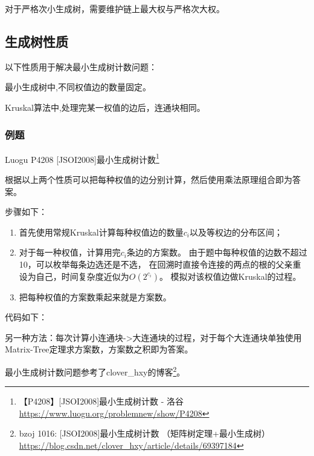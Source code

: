 对于严格次小生成树，需要维护链上最大权与严格次大权。

\subsection{生成树性质}
以下性质用于解决最小生成树计数问题：
\begin{property}
	最小生成树中,不同权值边的数量固定。
\end{property}
\begin{property}
	Kruskal算法中,处理完某一权值的边后，连通块相同。
\end{property}
\subsubsection{例题}

Luogu P4208 [JSOI2008]最小生成树计数\footnote{
【P4208】[JSOI2008]最小生成树计数 - 洛谷
\url{https://www.luogu.org/problemnew/show/P4208}
}

根据以上两个性质可以把每种权值的边分别计算，然后使用乘法原理组合即为答案。

步骤如下：
\begin{enumerate}
	\item 首先使用常规Kruskal计算每种权值边的数量$c_i$以及等权边的分布区间；
	\item 对于每一种权值，计算用完$c_i$条边的方案数。
	      由于题中每种权值的边数不超过10，可以枚举每条边选还是不选，
          在回溯时直接令连接的两点的根的父亲重设为自己，时间复杂度近似为$O(2^{c_i})$。
          模拟对该权值边做Kruskal的过程。
	\item 把每种权值的方案数乘起来就是方案数。
\end{enumerate}

代码如下：


另一种方法：每次计算小连通块->大连通块的过程，对于每个大连通块单独使用
Matrix-Tree定理求方案数，方案数之积即为答案。

最小生成树计数问题参考了clover\_hxy的博客\footnote{
bzoj 1016: [JSOI2008]最小生成树计数 （矩阵树定理+最小生成树）
\url{https://blog.csdn.net/clover\_hxy/article/details/69397184}
}。
